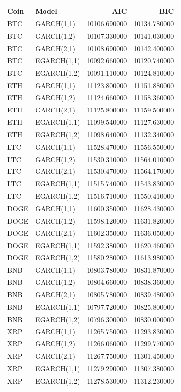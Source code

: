 \begin{tabular}{llrr}
\toprule
Coin & Model & AIC & BIC \\
\midrule
BTC & GARCH(1,1) & 10106.690000 & 10134.780000 \\
BTC & GARCH(1,2) & 10107.330000 & 10141.030000 \\
BTC & GARCH(2,1) & 10108.690000 & 10142.400000 \\
BTC & EGARCH(1,1) & 10092.660000 & 10120.740000 \\
BTC & EGARCH(1,2) & 10091.110000 & 10124.810000 \\
ETH & GARCH(1,1) & 11123.800000 & 11151.880000 \\
ETH & GARCH(1,2) & 11124.660000 & 11158.360000 \\
ETH & GARCH(2,1) & 11125.800000 & 11159.500000 \\
ETH & EGARCH(1,1) & 11099.540000 & 11127.630000 \\
ETH & EGARCH(1,2) & 11098.640000 & 11132.340000 \\
LTC & GARCH(1,1) & 11528.470000 & 11556.550000 \\
LTC & GARCH(1,2) & 11530.310000 & 11564.010000 \\
LTC & GARCH(2,1) & 11530.470000 & 11564.170000 \\
LTC & EGARCH(1,1) & 11515.740000 & 11543.830000 \\
LTC & EGARCH(1,2) & 11516.710000 & 11550.410000 \\
DOGE & GARCH(1,1) & 11600.350000 & 11628.430000 \\
DOGE & GARCH(1,2) & 11598.120000 & 11631.820000 \\
DOGE & GARCH(2,1) & 11602.350000 & 11636.050000 \\
DOGE & EGARCH(1,1) & 11592.380000 & 11620.460000 \\
DOGE & EGARCH(1,2) & 11580.280000 & 11613.980000 \\
BNB & GARCH(1,1) & 10803.780000 & 10831.870000 \\
BNB & GARCH(1,2) & 10804.660000 & 10838.360000 \\
BNB & GARCH(2,1) & 10805.780000 & 10839.480000 \\
BNB & EGARCH(1,1) & 10797.720000 & 10825.800000 \\
BNB & EGARCH(1,2) & 10796.300000 & 10830.000000 \\
XRP & GARCH(1,1) & 11265.750000 & 11293.830000 \\
XRP & GARCH(1,2) & 11266.060000 & 11299.770000 \\
XRP & GARCH(2,1) & 11267.750000 & 11301.450000 \\
XRP & EGARCH(1,1) & 11279.290000 & 11307.380000 \\
XRP & EGARCH(1,2) & 11278.530000 & 11312.230000 \\
\bottomrule
\end{tabular}
